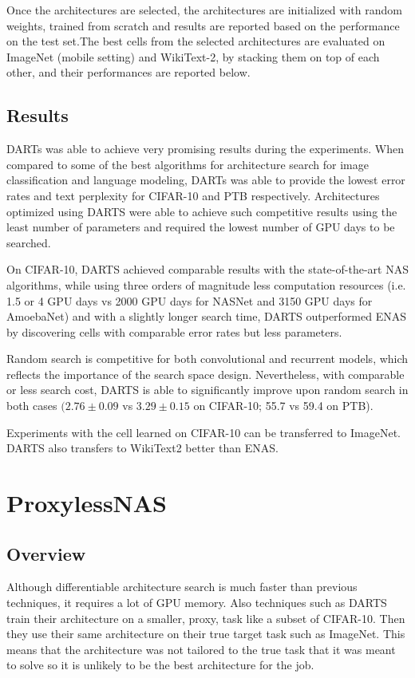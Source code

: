 \documentclass{ieee}
\begin{document}
Once the architectures are selected, the architectures are initialized with random weights, trained from scratch and results are reported based on the performance on the test set.The best cells from the selected architectures are evaluated on ImageNet (mobile setting) and WikiText-2, by stacking them on top of each other, and their performances are reported below.


\subsection{Results}
DARTs was able to achieve very promising results during the experiments. When compared to some of the best algorithms for architecture search for image classification and language modeling, DARTs was able to provide the lowest error rates and text perplexity for CIFAR-10 and PTB respectively. Architectures optimized using DARTS were able to achieve such competitive results using the least number of parameters and required the lowest number of GPU days to be searched.

On CIFAR-10, DARTS achieved comparable results with the state-of-the-art NAS algorithms, while using three orders of magnitude less computation resources (i.e. 1.5 or 4 GPU days vs 2000 GPU days for NASNet and 3150 GPU days for AmoebaNet) and with a slightly longer search time, DARTS outperformed ENAS by discovering cells with comparable error rates but less parameters.

Random search is competitive for both convolutional and recurrent models, which reflects the importance of the search space design. Nevertheless, with comparable or less search cost, DARTS is able to significantly improve upon random search in both cases $(2.76 \pm 0.09$ vs $3.29 \pm 0.15$ on CIFAR-10; 55.7 vs 59.4 on PTB).

Experiments with the cell learned on CIFAR-10 can be transferred to ImageNet. DARTS also transfers to WikiText2 better than ENAS.

\section{ProxylessNAS}
\subsection{Overview}
Although differentiable architecture search is much faster than previous techniques, it requires a lot of GPU memory. Also techniques such as DARTS train their architecture on a smaller, proxy, task like a subset of CIFAR-10. Then they use their same architecture on their true target task such as ImageNet. This means that the architecture was not tailored to the true task that it was meant to solve so it is unlikely to be the best architecture for the job.
\end{document}
